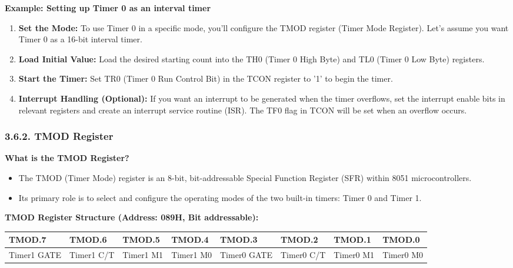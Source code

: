 \documentclass[
]{article}
\begin{document}
\textbf{Example: Setting up Timer 0 as an interval timer}

\begin{enumerate}
\def\labelenumi{\arabic{enumi}.}
\item
  \textbf{Set the Mode:} To use Timer 0 in a specific mode, you'll
  configure the TMOD register (Timer Mode Register). Let's assume you
  want Timer 0 as a 16-bit interval timer.
\item
  \textbf{Load Initial Value:} Load the desired starting count into the
  TH0 (Timer 0 High Byte) and TL0 (Timer 0 Low Byte) registers.
\item
  \textbf{Start the Timer:} Set TR0 (Timer 0 Run Control Bit) in the
  TCON register to '1' to begin the timer.
\item
  \textbf{Interrupt Handling (Optional):} If you want an interrupt to be
  generated when the timer overflows, set the interrupt enable bits in
  relevant registers and create an interrupt service routine (ISR). The
  TF0 flag in TCON will be set when an overflow occurs.
\end{enumerate}

\hypertarget{362-tmod-register}{%
\subsubsection{3.6.2. TMOD Register}\label{362-tmod-register}}

\textbf{What is the TMOD Register?}

\begin{itemize}
\item
  The TMOD (Timer Mode) register is an 8-bit, bit-addressable Special
  Function Register (SFR) within 8051 microcontrollers.
\item
  Its primary role is to select and configure the operating modes of the
  two built-in timers: Timer 0 and Timer 1.
\end{itemize}

\textbf{TMOD Register Structure (Address: 089H, Bit addressable):}

\begin{longtable}[]{@{}llllllll@{}}
\toprule
TMOD.7 & TMOD.6 & TMOD.5 & TMOD.4 & TMOD.3 & TMOD.2 & TMOD.1 & TMOD.0 \\
\midrule
\endhead
Timer1 GATE & Timer1 C/T & Timer1 M1 & Timer1 M0 & Timer0 GATE & Timer0
C/T & Timer0 M1 & Timer0 M0 \\
\bottomrule
\end{longtable}
\end{document}
